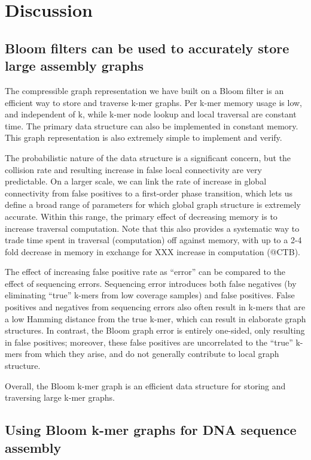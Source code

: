\documentclass[12pt]{article} \usepackage{simplemargins}
\begin{document}
\section{Discussion}

\subsection{Bloom filters can be used to accurately store large assembly
graphs}

The compressible graph representation we have built on a Bloom filter
is an efficient way to store and traverse k-mer graphs.  Per k-mer
memory usage is low, and independent of k, while k-mer node lookup and
local traversal are constant time.  The primary data structure can
also be implemented in constant memory.  This graph representation is
also extremely simple to implement and verify.

The probabilistic nature of the data structure is a significant
concern, but the collision rate and resulting increase in false local
connectivity are very predictable.  On a larger scale, we can link the
rate of increase in global connectivity from false positives to a
first-order phase transition, which lets us define a broad range of
parameters for which global graph structure is extremely accurate.
Within this range, the primary effect of decreasing memory is to increase
traversal computation.  Note that this also provides a systematic way
to trade time spent in traversal (computation) off against memory,
with up to a 2-4 fold decrease in memory in exchange for XXX increase
in computation (@CTB).

The effect of increasing false positive rate as ``error'' can be
compared to the effect of sequencing errors.  Sequencing error
introduces both false negatives (by eliminating ``true'' k-mers from
low coverage samples) and false positives.  False positives and
negatives from sequencing errors also often result in k-mers that are
a low Hamming distance from the true k-mer, which can result in
elaborate graph structures.  In contrast, the Bloom graph error is
entirely one-sided, only resulting in false positives; moreover, these
false positives are uncorrelated to the ``true'' k-mers from which
they arise, and do not generally contribute to local graph structure.

Overall, the Bloom k-mer graph is an efficient data structure for
storing and traversing large k-mer graphs.

\subsection{Using Bloom k-mer graphs for DNA sequence assembly}
\end{document}
